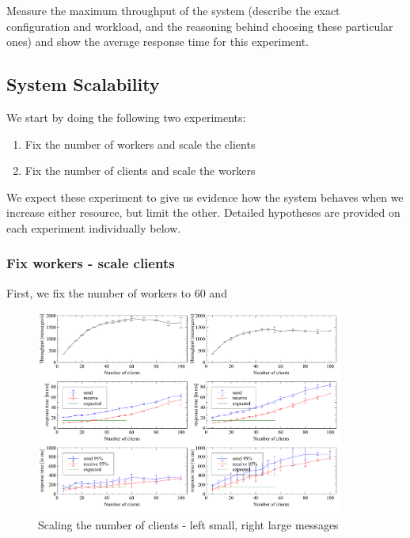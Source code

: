 \documentclass[11pt]{article}
\begin{document}
Measure the maximum throughput of the system (describe the exact
configuration and workload, and the reasoning behind choosing these
particular ones) and show the average response time for this experiment.

\subsection{System Scalability}\label{sec:system-scalability}

We start by doing the following two experiments:
\begin{enumerate}
  \item Fix the number of workers and scale the clients
  \item Fix the number of clients and scale the workers
\end{enumerate}
We expect these experiment to give us evidence how the system behaves when we increase either resource, but limit the other. Detailed hypotheses are provided on each experiment individually below.
\subsubsection{Fix workers - scale clients}
First, we fix the number of workers to 60 and 
\begin{figure}
  \begin{center}
    \includegraphics[width=0.9\textwidth]{../results/maxclientperinstance.pdf}
    \caption{Scaling the number of clients - left small, right large messages}
    \label{fig:maxclientperinstance}
  \end{center}
\end{figure}
\end{document}
